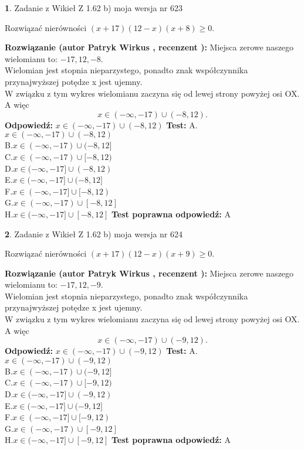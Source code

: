 \documentclass[12pt, a4paper]{article}
\theoremstyle{definition} %
\newtheorem{zad}{}
\newcommand{\zadStart}[1]{\begin{zad}#1\newline}
\newcommand{\zadStop}{\end{zad}}
\newcommand{\rozwStart}[2]{\noindent \textbf{Rozwiązanie (autor #1 , recenzent #2): }\newline}
\newcommand{\rozwStop}{\newline}
\newcommand{\odpStart}{\noindent \textbf{Odpowiedź:}\newline}
\newcommand{\odpStop}{\newline}
\newcommand{\testStart}{\noindent \textbf{Test:}\newline}
\newcommand{\testStop}{\newline}
\newcommand{\kluczStart}{\noindent \textbf{Test poprawna odpowiedź:}\newline}
\newcommand{\kluczStop}{\newline}
\begin{document}
\zadStart{Zadanie z Wikieł Z 1.62 b) moja wersja nr 623}

Rozwiązać nierówności $(x+17)(12-x)(x+8)\ge0$.
\zadStop
\rozwStart{Patryk Wirkus}{}
Miejsca zerowe naszego wielomianu to: $-17, 12, -8$.\\
Wielomian jest stopnia nieparzystego, ponadto znak współczynnika przy\linebreak najwyższej potędze x jest ujemny.\\ W związku z tym wykres wielomianu zaczyna się od lewej strony powyżej osi OX. A więc $$x \in (-\infty,-17) \cup (-8,12).$$
\rozwStop
\odpStart
$x \in (-\infty,-17) \cup (-8,12)$
\odpStop
\testStart
A.$x \in (-\infty,-17) \cup (-8,12)$\\
B.$x \in (-\infty,-17) \cup (-8,12]$\\
C.$x \in (-\infty,-17) \cup [-8,12)$\\
D.$x \in (-\infty,-17] \cup (-8,12)$\\
E.$x \in (-\infty,-17] \cup (-8,12]$\\
F.$x \in (-\infty,-17] \cup [-8,12)$\\
G.$x \in (-\infty,-17) \cup [-8,12]$\\
H.$x \in (-\infty,-17] \cup [-8,12]$
\testStop
\kluczStart
A
\kluczStop



\zadStart{Zadanie z Wikieł Z 1.62 b) moja wersja nr 624}

Rozwiązać nierówności $(x+17)(12-x)(x+9)\ge0$.
\zadStop
\rozwStart{Patryk Wirkus}{}
Miejsca zerowe naszego wielomianu to: $-17, 12, -9$.\\
Wielomian jest stopnia nieparzystego, ponadto znak współczynnika przy\linebreak najwyższej potędze x jest ujemny.\\ W związku z tym wykres wielomianu zaczyna się od lewej strony powyżej osi OX. A więc $$x \in (-\infty,-17) \cup (-9,12).$$
\rozwStop
\odpStart
$x \in (-\infty,-17) \cup (-9,12)$
\odpStop
\testStart
A.$x \in (-\infty,-17) \cup (-9,12)$\\
B.$x \in (-\infty,-17) \cup (-9,12]$\\
C.$x \in (-\infty,-17) \cup [-9,12)$\\
D.$x \in (-\infty,-17] \cup (-9,12)$\\
E.$x \in (-\infty,-17] \cup (-9,12]$\\
F.$x \in (-\infty,-17] \cup [-9,12)$\\
G.$x \in (-\infty,-17) \cup [-9,12]$\\
H.$x \in (-\infty,-17] \cup [-9,12]$
\testStop
\kluczStart
A
\kluczStop
\end{document}
